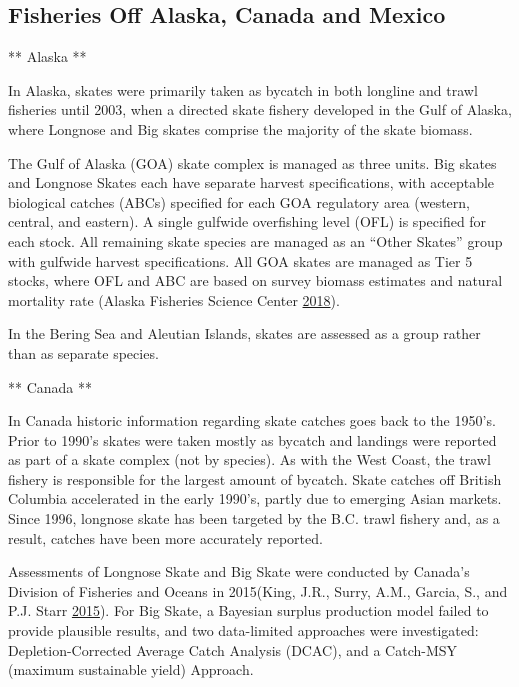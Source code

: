 \documentclass[12pt,]{article}
\begin{document}
\hypertarget{fisheries-off-alaska-canada-and-mexico}{%
\subsection{Fisheries Off Alaska, Canada and
Mexico}\label{fisheries-off-alaska-canada-and-mexico}}

** Alaska **

In Alaska, skates were primarily taken as bycatch in both longline and
trawl fisheries until 2003, when a directed skate fishery developed in
the Gulf of Alaska, where Longnose and Big skates comprise the majority
of the skate biomass.

The Gulf of Alaska (GOA) skate complex is managed as three units. Big
skates and Longnose Skates each have separate harvest specifications,
with acceptable biological catches (ABCs) specified for each GOA
regulatory area (western, central, and eastern). A single gulfwide
overfishing level (OFL) is specified for each stock. All remaining skate
species are managed as an ``Other Skates'' group with gulfwide harvest
specifications. All GOA skates are managed as Tier 5 stocks, where OFL
and ABC are based on survey biomass estimates and natural mortality rate
(Alaska Fisheries Science Center
\protect\hyperlink{ref-AFSC2018}{2018}).

In the Bering Sea and Aleutian Islands, skates are assessed as a group
rather than as separate species.

** Canada **

In Canada historic information regarding skate catches goes back to the
1950's. Prior to 1990's skates were taken mostly as bycatch and landings
were reported as part of a skate complex (not by species). As with the
West Coast, the trawl fishery is responsible for the largest amount of
bycatch. Skate catches off British Columbia accelerated in the early
1990's, partly due to emerging Asian markets. Since 1996, longnose skate
has been targeted by the B.C. trawl fishery and, as a result, catches
have been more accurately reported.

Assessments of Longnose Skate and Big Skate were conducted by Canada's
Division of Fisheries and Oceans in 2015(King, J.R., Surry, A.M.,
Garcia, S., and P.J. Starr \protect\hyperlink{ref-King2015}{2015}). For
Big Skate, a Bayesian surplus production model failed to provide
plausible results, and two data-limited approaches were investigated:
Depletion-Corrected Average Catch Analysis (DCAC), and a Catch-MSY
(maximum sustainable yield) Approach.
\end{document}
